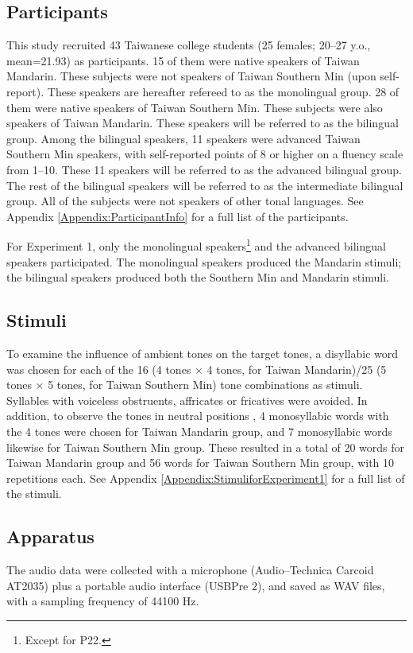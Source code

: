 \documentclass[12pt]{report}
\begin{document}
\begin{CJK}{UTF8}{bsmi}
\subsection{Participants}

This study recruited 43 Taiwanese college students (25 females; 20–27 y.o., mean=21.93) as participants. 15 of them were native speakers of Taiwan Mandarin. These subjects were not speakers of Taiwan Southern Min (upon self-report). These speakers are hereafter refereed to as the monolingual group. 28 of them were native speakers of Taiwan Southern Min. These subjects were also speakers of Taiwan Mandarin. These speakers will be referred to as the bilingual group. Among the bilingual speakers, 11 speakers were advanced Taiwan Southern Min speakers, with self-reported points of 8 or higher on a fluency scale from 1–10. These 11 speakers will be referred to as the advanced bilingual group. The rest of the bilingual speakers will be referred to as the intermediate bilingual group. All of the subjects were not speakers of other tonal languages. See Appendix \ref{Appendix:ParticipantInfo} for a full list of the participants. 

For Experiment 1, only the monolingual speakers\footnote{Except for P22.} and the advanced bilingual speakers participated. The monolingual speakers produced the Mandarin stimuli; the bilingual speakers produced both the Southern Min and Mandarin stimuli.

\subsection{Stimuli}
To examine the influence of ambient tones on the target tones, a disyllabic word was chosen for each of the 16 (4 tones × 4 tones, for Taiwan Mandarin)/25 (5 tones × 5 tones\footnotemark, for Taiwan Southern Min) tone combinations as stimuli. Syllables with voiceless obstruents, affricates or fricatives were avoided. In addition, to observe the tones in neutral positions , 4 monosyllabic words with the 4 tones were chosen for Taiwan Mandarin group, and 7 monosyllabic words likewise for Taiwan Southern Min group. These resulted in a total of 20 words for Taiwan Mandarin group and 56 words for Taiwan Southern Min group, with 10 repetitions each. See Appendix \ref{Appendix:StimuliforExperiment1} for a full list of the stimuli.


\subsection{Apparatus}
The audio data were collected with a microphone (Audio–Technica Carcoid AT2035) plus a portable audio interface (USBPre 2), and saved as WAV files, with a sampling frequency of 44100 Hz.


\end{CJK}
\end{document}

